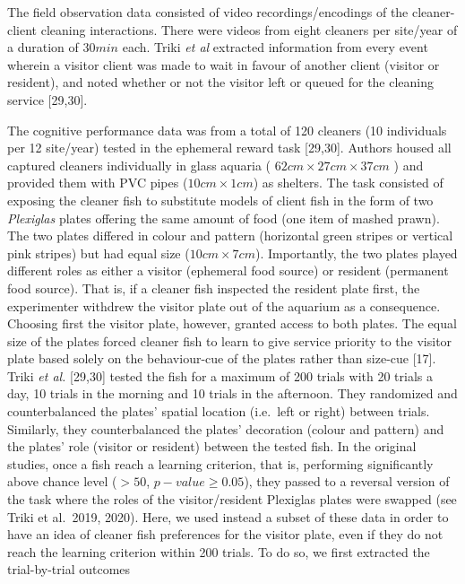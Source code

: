 \documentclass[10pt,letterpaper]{article}
\begin{document}
The field observation data consisted of video recordings/encodings of
the cleaner-client cleaning interactions. There were videos from eight
cleaners per site/year of a duration of \(30 min\) each. Triki \emph{et
al} extracted information from every event wherein a visitor client was
made to wait in favour of another client (visitor or resident), and
noted whether or not the visitor left or queued for the cleaning service
{[}29,30{]}.

The cognitive performance data was from a total of 120 cleaners (10
individuals per 12 site/year) tested in the ephemeral reward task
{[}29,30{]}. Authors housed all captured cleaners individually in glass
aquaria ( \(62cm \times 27cm \times 37 cm\) ) and provided them with PVC
pipes (\(10 cm \times 1 cm\)) as shelters. The task consisted of
exposing the cleaner fish to substitute models of client fish in the
form of two \emph{Plexiglas} plates offering the same amount of food
(one item of mashed prawn). The two plates differed in colour and
pattern (horizontal green stripes or vertical pink stripes) but had
equal size (\(10 cm \times 7 cm\)). Importantly, the two plates played
different roles as either a visitor (ephemeral food source) or resident
(permanent food source). That is, if a cleaner fish inspected the
resident plate first, the experimenter withdrew the visitor plate out of
the aquarium as a consequence. Choosing first the visitor plate,
however, granted access to both plates. The equal size of the plates
forced cleaner fish to learn to give service priority to the visitor
plate based solely on the behaviour-cue of the plates rather than
size-cue {[}17{]}. Triki \emph{et al.} {[}29,30{]} tested the fish for a
maximum of 200 trials with 20 trials a day, 10 trials in the morning and
10 trials in the afternoon. They randomized and counterbalanced the
plates' spatial location (i.e.~left or right) between trials. Similarly,
they counterbalanced the plates' decoration (colour and pattern) and the
plates' role (visitor or resident) between the tested fish. In the
original studies, once a fish reach a learning criterion, that is,
performing significantly above chance level (\(> 50%
\), \(p-value ≥ 0.05\)), they passed to a reversal version of the task
where the roles of the visitor/resident Plexiglas plates were swapped
(see Triki et al.~2019, 2020). Here, we used instead a subset of these
data in order to have an idea of cleaner fish preferences for the
visitor plate, even if they do not reach the learning criterion within
200 trials. To do so, we first extracted the trial-by-trial outcomes
\end{document}
